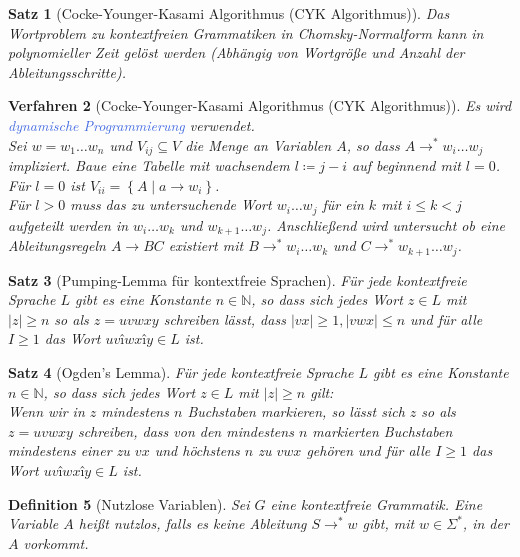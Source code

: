 \documentclass[11pt]{article}
\newcommand{\tcol}[1]{\textcolor{RoyalBlue}{#1}}
\newcommand{\set}[1]{\left\lbrace #1\right\rbrace}
\theoremstyle{break}
\newtheorem{satz}{Satz}[section]
\newtheorem{defi}[satz]{Definition}
\newtheorem{verf}[satz]{Verfahren}
\begin{document}
\begin{satz}[Cocke-Younger-Kasami Algorithmus (CYK Algorithmus)]
Das Wortproblem zu kontextfreien Grammatiken in Chomsky-Normalform kann in polynomieller Zeit gelöst werden (Abhängig von Wortgröße und Anzahl der Ableitungsschritte).
\end{satz}

\begin{verf}[Cocke-Younger-Kasami Algorithmus (CYK Algorithmus)]
Es wird \tcol{dynamische Programmierung} verwendet.\\
Sei $w=w_1\dots w_n$ und $V_{ij}\subseteq V$ die Menge an Variablen $A$, so dass $A\rightarrow^*w_i\dots w_j$ impliziert. Baue eine Tabelle mit wachsendem $l\coloneqq j-i$ auf beginnend mit $l=0$.\\
Für $l=0$ ist $V_{ii}=\set{A\mid a\rightarrow w_i}$.\\
Für $l>0$ muss das zu untersuchende Wort $w_i\dots w_j$ für ein $k$ mit $i\leq k<j$ aufgeteilt werden in $w_i\dots w_k$ und $w_{k+1}\dots w_j$. Anschließend wird untersucht ob eine Ableitungsregeln $A\rightarrow BC$ existiert mit $B\rightarrow^* w_i\dots w_k$ und $C\rightarrow^* w_{k+1}\dots w_j$.
\end{verf}

\begin{satz}[Pumping-Lemma für kontextfreie Sprachen]
Für jede kontextfreie Sprache $L$ gibt es eine Konstante $n\in\mathbb{N}$, so dass sich jedes Wort $z\in L$ mit $|z|\geq n$ so als $z=uvwxy$ schreiben lässt, dass $|vx|\geq 1,|vwx|\leq n$ und für alle $I\geq 1$ das Wort $uvîwxîy\in L$ ist.
\end{satz}

\begin{satz}[Ogden's Lemma]
Für jede kontextfreie Sprache $L$ gibt es eine Konstante $n\in\mathbb{N}$, so dass sich jedes Wort $z\in L$ mit $|z|\geq n$ gilt:\\
Wenn wir in $z$ mindestens $n$ Buchstaben markieren, so lässt sich $z$ so als $z=uvwxy$ schreiben, dass von den mindestens $n$ markierten Buchstaben mindestens einer zu $vx$ und höchstens $n$ zu $vwx$ gehören und für alle $I\geq 1$ das Wort $uvîwxîy\in L$ ist.
\end{satz}

\begin{defi}[Nutzlose Variablen]
Sei $G$ eine kontextfreie Grammatik. Eine Variable $A$ heißt nutzlos, falls es keine Ableitung $S\rightarrow^* w$ gibt, mit $w\in\Sigma^*$, in der $A$ vorkommt.
\end{defi}
\end{document}
